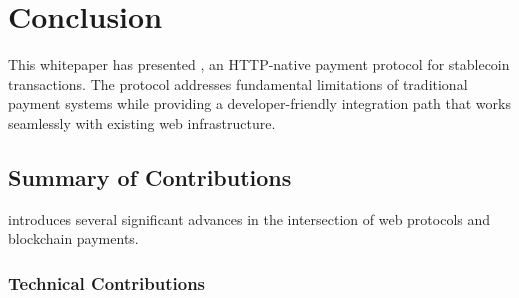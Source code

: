 \chapter{Conclusion}
\label{ch:conclusion}

This whitepaper has presented \tprotocol{}, an HTTP-native payment protocol for stablecoin transactions. The protocol addresses fundamental limitations of traditional payment systems while providing a developer-friendly integration path that works seamlessly with existing web infrastructure.

\section{Summary of Contributions}
\label{sec:summary}

\tprotocol{} introduces several significant advances in the intersection of web protocols and blockchain payments.

\subsection{Technical Contributions}

